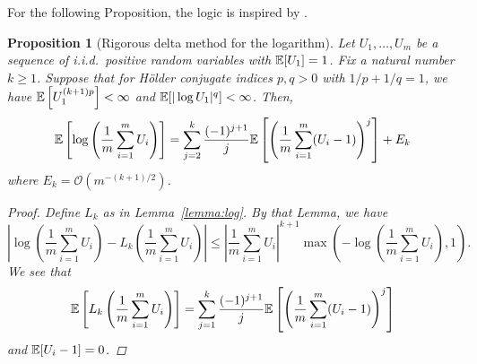 \documentclass[a4paper, 10pt]{report}
\theoremstyle{plain}
\newtheorem{proposition}[theorem]{Proposition}
\begin{document}
	For the following Proposition, the logic is inspired by \citet{goda2020multilevel}.
	\begin{proposition}[Rigorous delta method for the logarithm]
		\label{prop:rigorous}
		Let $U_1,\dots,U_m$ be a sequence of i.i.d.~positive random variables with $\mathbb{E}[U_1]=1$.
		Fix a natural number $k\ge 1$.
		Suppose that for H\"{o}lder conjugate indices $p,q>0$ with $1/p + 1/q = 1$, we have $\mathbb{E}\left[U_1^{(k+1)p}\right]<\infty$ and $\mathbb{E}[|\log U_1|^q]<\infty$.
		Then, 
		\begin{equation}
		\mathbb{E}\left[ \log \left(\frac{1}{m} \sum_{i=1}^m U_i \right) \right] = \sum_{j=2}^k \frac{(-1)^{j+1}}{j}\mathbb{E}\left[\left(\frac{1}{m} \sum_{i=1}^m (U_i-1) \right)^j\right] + E_k
		\end{equation}
		where $E_k = \mathcal{O}\left(m^{-(k+1)/2}\right)$.
		\begin{proof}
			Define $L_k$ as in Lemma~\ref{lemma:log}. By that Lemma, we have
			\begin{equation}
			\left| \log\left( \frac{1}{m}\sum_{i=1}^m U_i \right) - L_k\left(\frac{1}{m}\sum_{i=1}^m U_i  \right) \right| \le \left| \frac{1}{m}\sum_{i=1}^m U_i \right|^{k+1} \max\left(-\log\left( \frac{1}{m}\sum_{i=1}^m U_i \right), 1\right).
			\end{equation}
			We see that 
			\begin{equation}
			\mathbb{E}\left[L_k\left(\frac{1}{m}\sum_{i=1}^m U_i\right) \right] = \sum_{j=1}^k \frac{(-1)^{j+1}}{j}\mathbb{E}\left[\left(\frac{1}{m} \sum_{i=1}^m (U_i-1) \right)^j\right]
			\end{equation}
			and $\mathbb{E}[U_i - 1] = 0$.
			

\end{proof}
\end{proposition}
\end{document}
